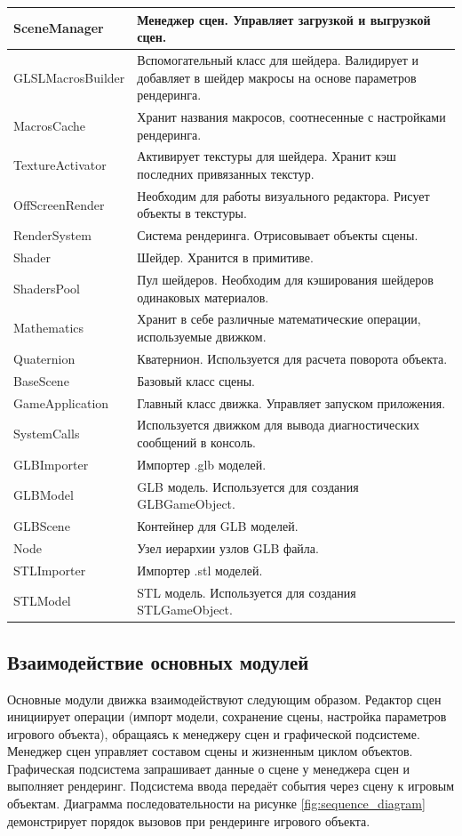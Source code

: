 \begin{xltabular}{\textwidth}{|>{\raggedright\arraybackslash}p{6cm}|>{\raggedright\arraybackslash}X|}
	SceneManager & Менеджер сцен. Управляет загрузкой и выгрузкой сцен. \\ \hline
	GLSLMacrosBuilder & Вспомогательный класс для шейдера. Валидирует и добавляет в шейдер макросы на основе параметров рендеринга. \\ \hline
	MacrosCache & Хранит названия макросов, соотнесенные с настройками рендеринга. \\ \hline
	TextureActivator & Активирует текстуры для шейдера. Хранит кэш последних привязанных текстур. \\ \hline
	OffScreenRender & Необходим для работы визуального редактора. Рисует объекты в текстуры. \\ \hline
	RenderSystem & Система рендеринга. Отрисовывает объекты сцены. \\ \hline
	Shader & Шейдер. Хранится в примитиве. \\ \hline
	ShadersPool & Пул шейдеров. Необходим для кэширования шейдеров одинаковых материалов. \\ \hline
	Mathematics & Хранит в себе различные математические операции, используемые движком. \\ \hline
	Quaternion & Кватернион. Используется для расчета поворота объекта. \\ \hline
	BaseScene & Базовый класс сцены. \\ \hline
	GameApplication & Главный класс движка. Управляет запуском приложения. \\ \hline
	SystemCalls & Используется движком для вывода диагностических сообщений в консоль. \\ \hline
	GLBImporter & Импортер .glb моделей. \\ \hline
	GLBModel & GLB модель. Используется для создания GLBGameObject. \\ \hline
	GLBScene & Контейнер для GLB моделей. \\ \hline
	Node & Узел иерархии узлов GLB файла. \\ \hline
	STLImporter & Импортер .stl моделей. \\ \hline
	STLModel & STL модель. Используется для создания STLGameObject.
\end{xltabular}

\subsection{Взаимодействие основных модулей}
Основные модули движка взаимодействуют следующим образом. Редактор сцен инициирует операции (импорт модели, сохранение сцены, настройка параметров игрового объекта), обращаясь к менеджеру сцен и графической подсистеме. Менеджер сцен управляет составом сцены и жизненным циклом объектов. Графическая подсистема запрашивает данные о сцене у менеджера сцен и выполняет рендеринг. Подсистема ввода передаёт события через сцену к игровым объектам. Диаграмма последовательности на рисунке \ref{fig:sequence_diagram} демонстрирует порядок вызовов при рендеринге игрового объекта.

